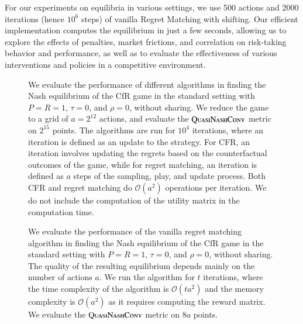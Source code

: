 \documentclass[preprint,12pt,authoryear]{elsarticle}
\theoremstyle{definition}
\begin{document}
For our experiments on equilibria in various settings, we use 500 actions and 2000 iterations (hence $10^6$ steps) of vanilla Regret Matching with shifting. Our efficient implementation computes the equilibrium in just a few seconds, allowing us to explore the effects of penalties, market frictions, and correlation on risk-taking behavior and performance, as well as to evaluate the effectiveness of various interventions and policies in a competitive environment.


\begin{figure}[htbp]
  \centering
  \begin{minipage}[t]{0.48\textwidth}
    \centering
    
  \end{minipage}
  \hfill
  \begin{minipage}[t]{0.48\textwidth}
    \centering
    
  \end{minipage}
  \caption{We evaluate the performance of different algorithms in finding the Nash equilibrium of the CfR game in the standard setting with $P=R=1$, $\tau=0$, and $\rho=0$, without sharing. We reduce the game to a grid of $a=2^{12}$ actions, and evaluate the $\textsc{QuasiNashConv}$ metric on $2^{15}$ points. The algorithms are run for $10^4$ iterations, where an iteration is defined as an update to the strategy. For CFR, an iteration involves updating the regrets based on the counterfactual outcomes of the game, while for regret matching, an iteration is defined as $a$ steps of the sampling, play, and update process. Both CFR and regret matching do $\mathcal{O}(a^2)$ operations per iteration. We do not include the computation of the utility matrix in the computation time.}
  \label{fig:rm-different}  
\end{figure}




\begin{figure}[htbp]
  \centering
  \begin{minipage}[t]{0.48\textwidth}
    \centering
    
  \end{minipage}
  \hfill
  \begin{minipage}[t]{0.48\textwidth}
    \centering
    
  \end{minipage}
  \caption{We evaluate the performance of the vanilla regret matching algorithm in finding the Nash equilibrium of the CfR game in the standard setting with $P=R=1$, $\tau=0$, and $\rho=0$, without sharing. The quality of the resulting equilibrium depends mainly on the number of actions $a$. We run the algorithm for $t$ iterations, where the time complexity of the algorithm is $\mathcal{O}(t a^2)$ and the memory complexity is $\mathcal{O}(a^2)$ as it requires computing the reward matrix. We evaluate the $\textsc{QuasiNashConv}$ metric on $8a$ points.}
  \label{fig:rm-size}  
\end{figure}
\end{document}
